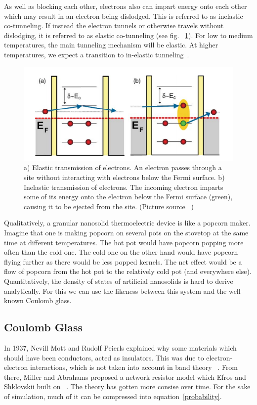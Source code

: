 As well as blocking each other, electrons also can impart energy onto each other which may result in an electron being dislodged. This is referred to as inelastic co-tunneling. If instead the electron tunnels or otherwise travels without dislodging, it is referred to as elastic co-tunneling (see fig. ~\ref{inelasticvselastic}). For low to medium temperatures, the main tunneling mechanism will be elastic. At higher temperatures, we expect a transition to in-elastic tunneling~\cite{Glazman05}.

\begin{figure}[htbp]
\begin{center}
\includegraphics[scale=.50]{elasticIn.png}
\caption{a) Elastic transmission of electrons. An electron passes through a site without interacting with electrons below the Fermi surface. b) Inelastic transmission of electrons. The incoming electron imparts some of its energy onto the electron below the Fermi surface (green), causing it to be ejected from the site. (Picture source ~\cite{glatz09})}
\label{inelasticvselastic}
\end{center}
\end{figure}

 Qualitatively, a granular nanosolid thermoelectric device is like a popcorn maker. Imagine that one is making popcorn on several pots on the stovetop at the same time at different temperatures. The hot pot would have popcorn popping more often than the cold one. The cold one on the other hand would have popcorn flying further as there would be less popped kernels. The net effect would be a flow of popcorn from the hot pot to the relatively cold pot (and everywhere else). Quantitatively, the density of states of artificial nanosolids is hard to derive analytically. For this we can use the likeness between this system and the well-known Coulomb glass.  

\subsection{Coulomb Glass}
In 1937, Nevill Mott and Rudolf Peierls explained why some materials which should have been conductors, acted as insulators. This was due to electron-electron interactions, which is not taken into account in band theory ~\cite{mott72}. From there, Miller and Abrahams proposed a network resistor model which Efros and Shklovskii built on ~\cite{efros75}. The theory has gotten more consise over time. For the sake of simulation, much of it can be compressed into equation~\ref{probability}.

